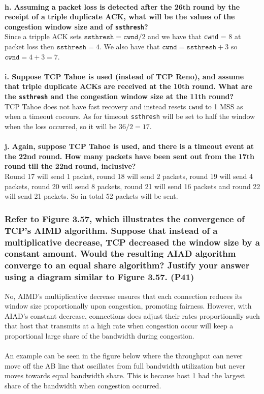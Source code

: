 \\
\textbf{h. Assuming a packet loss is detected after the 26th round by the receipt of a triple duplicate ACK, what will be the values of the congestion window size and of \texttt{ssthresh}?} \\
Since a tripple ACK sets $\texttt{ssthresh} = \texttt{cwnd}/2$ and we have that \texttt{cwnd} = 8 at packet loss then $\texttt{ssthresh} = 4$. We also have that $\texttt{cwnd} = \texttt{ssthresh} + 3$ so $\texttt{cwnd} = 4 + 3 = 7$. \\
\\
\textbf{i. Suppose TCP Tahoe is used (instead of TCP Reno), and assume that triple duplicate ACKs are received at the 10th round. What are the \texttt{ssthresh} and the congestion window size at the 11th round?} \\
TCP Tahoe does not have fast recovery and instead resets \texttt{cwnd} to 1 MSS as when a timeout cocours. As for timeout \texttt{ssthresh} will be set to half the window when the loss occurred, so it will be $36/2 = 17$. \\
\\
\textbf{j. Again, suppose TCP Tahoe is used, and there is a timeout event at the 22nd round. How many packets have been sent out from the 17th round till the 22nd round, inclusive?} \\
Round 17 will send 1 packet, round 18 will send 2 packets, round 19 will send 4 packets, round 20 will send 8 packets, round 21 will send 16 packets and round 22 will send 21 packets. So in total 52 packets will be sent. 



\subsubsection{Refer to Figure 3.57, which illustrates the convergence of TCP's AIMD algorithm. Suppose that instead of a multiplicative decrease, TCP decreased the window size by a constant amount. Would the resulting AIAD algorithm converge to an equal share algorithm? Justify your answer using a diagram similar to Figure 3.57. (P41)} 

No, AIMD's multiplicative decrease ensures that each connection reduces its window size proportionally upon congestion, promoting fairness. However, with AIAD's constant decrease, connections does adjust their rates proportionally such that host that transmits at a high rate when congestion occur will keep a proportional large share of the bandwidth during congestion. \\
\\
An example can be seen in the figure below where the throughput can never move off the AB line that oscillates from full bandwidth utilization but never moves towards equal bandwidth share. This is because host 1 had the largest share of the bandwidth when congestion occurred.

